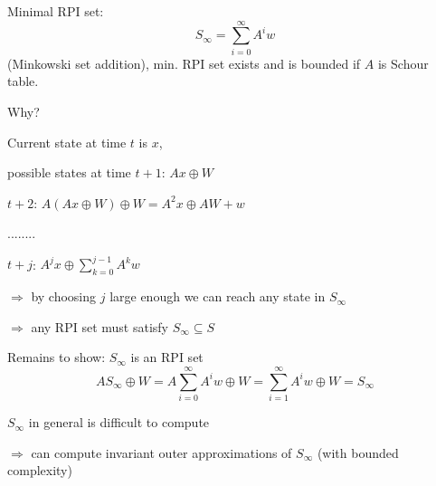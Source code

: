Minimal RPI set:
\begin{equation*}
S_{\infty} = \sum_{i = 0}^{\infty} A^iw
\end{equation*}
(Minkowski set addition), min. RPI set exists and is bounded if $A$ is Schour table.

Why?

Current state at time $t$ is $x$,

possible states at time $t+1$: $Ax \oplus W$
                        
$t+2$: $A(Ax \oplus W) \oplus W = A^2x \oplus AW + w$
  
       ........
        
$t+j$: $A^jx \oplus \sum_{k=0}^{j-1}A^kw$

$\Rightarrow$ by choosing $j$ large enough we can reach any state in $S_{\infty}$

$\Rightarrow$ any RPI set must satisfy $S_{\infty} \subseteq S$

Remains to show: $S_{\infty}$ is an RPI set
\begin{equation*}
AS_{\infty} \oplus W = A\sum_{i=0}^{\infty}A^iw \oplus W = \sum_{i=1}^{\infty}A^iw \oplus W = S_{\infty} 
\end{equation*}

$S_{\infty}$ in  general is difficult to compute 

$\Rightarrow$ can compute invariant outer approximations of $S_{\infty}$ (with bounded complexity)